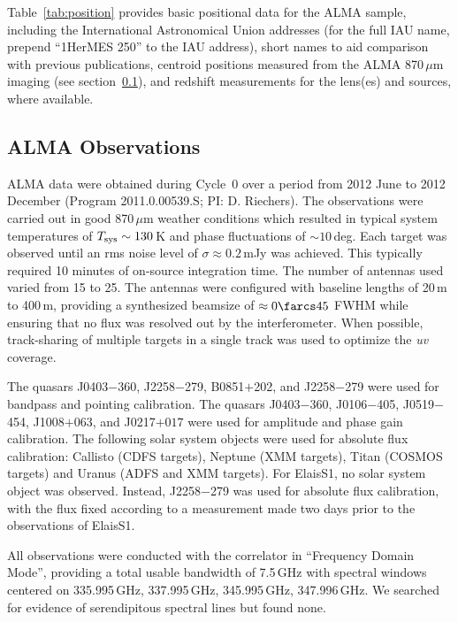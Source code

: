 \documentclass[iop]{emulateapj}
\begin{document}
Table~\ref{tab:position} provides basic positional data for the ALMA sample,
including the International Astronomical Union addresses (for the full IAU
name, prepend ``1HerMES 250'' to the IAU address), short names to aid
comparison with previous publications, centroid positions measured from the
ALMA 870$\, \mu$m imaging (see section~\ref{sec:almaobs}), and redshift
measurements for the lens(es) and sources, where available.



\subsection{ALMA Observations}\label{sec:almaobs}

ALMA data were obtained during Cycle~0 over a period from 2012 June to 2012
December (Program 2011.0.00539.S; PI: D. Riechers).  The observations were
carried out in good 870$\,\mu$m weather conditions which resulted in typical
system temperatures of $T_{\rm sys} \sim 130\,$K and phase fluctuations of
$\sim 10\,$deg.  Each target was observed until an rms noise level of $\sigma
\approx 0.2\,$mJy was achieved.  This typically required 10 minutes of
on-source integration time.  The number of antennas used varied from 15 to 25.
The antennas were configured with baseline lengths of 20$\,$m to 400$\,$m,
providing a synthesized beamsize of $\approx 0\farcs45$ FWHM while ensuring
that no flux was resolved out by the interferometer.  When possible,
track-sharing of multiple targets in a single track was used to optimize the
{\it uv} coverage.

The quasars J0403$-$360, J2258$-$279, B0851$+$202, and J2258$-$279 were used
for bandpass and pointing calibration.  The quasars J0403$-$360, J0106$-$405,
J0519$-$454, J1008$+$063, and J0217$+017$ were used for amplitude and phase
gain calibration.  The following solar system objects were used for absolute
flux calibration: Callisto (CDFS targets), Neptune (XMM targets), Titan (COSMOS
targets) and Uranus (ADFS and XMM targets).  For ElaisS1, no solar system
object was observed.  Instead, J2258$-$279 was used for absolute flux
calibration, with the flux fixed according to a measurement made two days prior
to the observations of ElaisS1.

All observations were conducted with the correlator in ``Frequency Domain
Mode'', providing a total usable bandwidth of 7.5$\,$GHz with spectral windows
centered on 335.995$\,$GHz, 337.995$\,$GHz, 345.995$\,$GHz, 347.996$\,$GHz.  We
searched for evidence of serendipitous spectral lines but found none.
\end{document}
